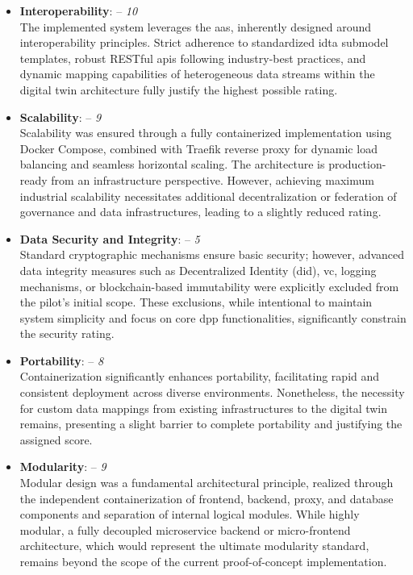 \begin{itemize}[itemsep=0.5\baselineskip]
    \item \textbf{Interoperability}: – \textit{10}\\
    The implemented system leverages the \acrlong{aas}, inherently designed around interoperability principles. Strict adherence to standardized \ac{idta} submodel templates, robust RESTful \ac{api}s following industry-best practices, and dynamic mapping capabilities of heterogeneous data streams within the digital twin architecture fully justify the highest possible rating.

    \item \textbf{Scalability}: – \textit{9}\\
    Scalability was ensured through a fully containerized implementation using Docker Compose, combined with Traefik reverse proxy for dynamic load balancing and seamless horizontal scaling. The architecture is production-ready from an infrastructure perspective. However, achieving maximum industrial scalability necessitates additional decentralization or federation of governance and data infrastructures, leading to a slightly reduced rating.

    \item \textbf{Data Security and Integrity}: – \textit{5}\\
    Standard cryptographic mechanisms ensure basic security; however, advanced data integrity measures such as Decentralized Identity (\ac{did}), \acrlong{vc}, logging mechanisms, or blockchain-based immutability were explicitly excluded from the pilot's initial scope. These exclusions, while intentional to maintain system simplicity and focus on core \ac{dpp} functionalities, significantly constrain the security rating.

    \item \textbf{Portability}: – \textit{8}\\
    Containerization significantly enhances portability, facilitating rapid and consistent deployment across diverse environments. Nonetheless, the necessity for custom data mappings from existing infrastructures to the digital twin remains, presenting a slight barrier to complete portability and justifying the assigned score.

    \item \textbf{Modularity}: – \textit{9}\\
    Modular design was a fundamental architectural principle, realized through the independent containerization of frontend, backend, proxy, and database components and separation of internal logical modules. While highly modular, a fully decoupled microservice backend or micro-frontend architecture, which would represent the ultimate modularity standard, remains beyond the scope of the current proof-of-concept implementation.


\end{itemize}
